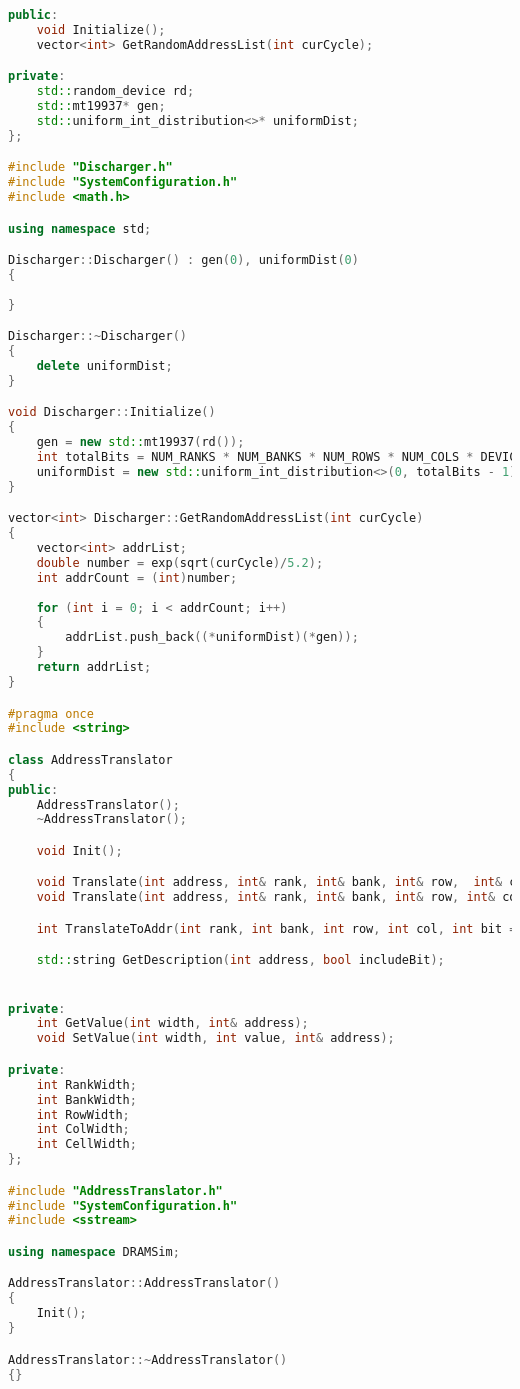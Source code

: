 \begin{lstlisting}[language=C++, style=cplusplusstyle]
public:
    void Initialize();
    vector<int> GetRandomAddressList(int curCycle);

private:
    std::random_device rd;
    std::mt19937* gen;
    std::uniform_int_distribution<>* uniformDist;
};

#include "Discharger.h"
#include "SystemConfiguration.h"
#include <math.h>

using namespace std;

Discharger::Discharger() : gen(0), uniformDist(0)
{
    
}

Discharger::~Discharger()
{
    delete uniformDist;
}

void Discharger::Initialize()
{
    gen = new std::mt19937(rd());
    int totalBits = NUM_RANKS * NUM_BANKS * NUM_ROWS * NUM_COLS * DEVICE_WIDTH;
    uniformDist = new std::uniform_int_distribution<>(0, totalBits - 1);
}

vector<int> Discharger::GetRandomAddressList(int curCycle)
{
    vector<int> addrList;
    double number = exp(sqrt(curCycle)/5.2);
    int addrCount = (int)number;
    
    for (int i = 0; i < addrCount; i++)
    {
        addrList.push_back((*uniformDist)(*gen));
    }
    return addrList;
}

#pragma once
#include <string>

class AddressTranslator
{
public:
    AddressTranslator();
    ~AddressTranslator();

	void Init();

    void Translate(int address, int& rank, int& bank, int& row,  int& col);
    void Translate(int address, int& rank, int& bank, int& row, int& col, int& bit);

	int TranslateToAddr(int rank, int bank, int row, int col, int bit = -1);

    std::string GetDescription(int address, bool includeBit);


private:
    int GetValue(int width, int& address);
	void SetValue(int width, int value, int& address);

private:
	int RankWidth;
    int BankWidth;
    int RowWidth;
    int ColWidth;
    int CellWidth;
};

#include "AddressTranslator.h"
#include "SystemConfiguration.h"
#include <sstream>

using namespace DRAMSim;

AddressTranslator::AddressTranslator()
{
	Init();
}

AddressTranslator::~AddressTranslator()
{}


\end{lstlisting}
